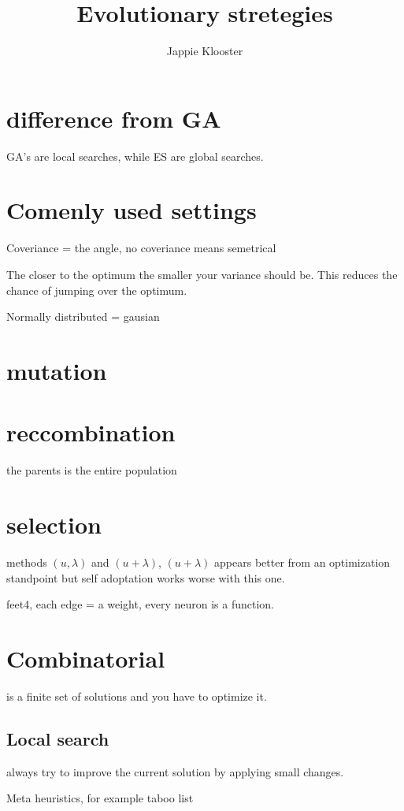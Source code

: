 \documentclass{article}
\begin{document}
\author{Jappie Klooster}
\title{Evolutionary stretegies}
\maketitle

\section{difference from GA}
GA's are local searches, while ES are global searches.
\section{Comenly used settings}
Coveriance = the angle, no coveriance means semetrical

The closer to the optimum the smaller your variance should be. This reduces
the chance of jumping over the optimum.

Normally distributed = gausian

\section{mutation}

\section{reccombination}
the parents is the entire population

\section{selection}
 methods $(u,\lambda)$ and $(u+\lambda)$, $(u+\lambda)$ appears better from
 an optimization standpoint but self adoptation works worse with this one.

feet4, each edge = a weight, every neuron is a function.

\section{Combinatorial}
is a finite set of solutions and you have to optimize it.

\subsection{Local search}
always try to improve the current solution by applying small changes.

Meta heuristics, for example taboo list
\end{document}
